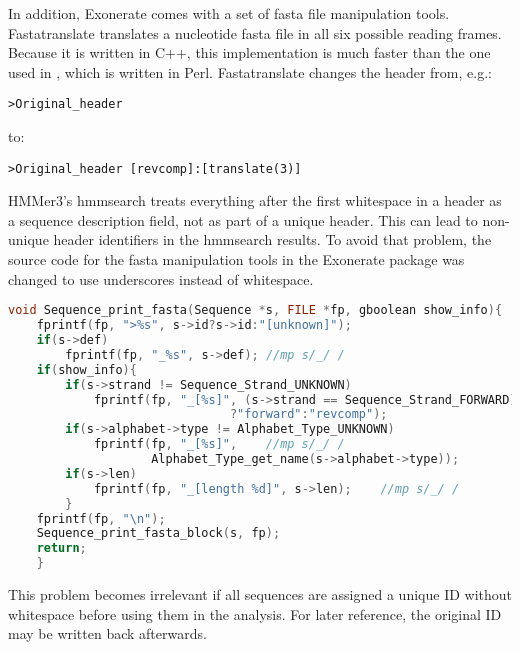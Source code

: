 In addition, Exonerate comes with a set of fasta file manipulation tools.
Fastatranslate translates a nucleotide fasta file in all six possible reading
frames. Because it is written in C++, this implementation is much faster than the
one used in \hamstr, which is written in Perl. Fastatranslate changes the
header from, e.g.:

\begin{verbatim}
>Original_header
\end{verbatim}

to:

\begin{verbatim}
>Original_header [revcomp]:[translate(3)]
\end{verbatim}

HMMer3's hmmsearch treats everything after the first whitespace in a header as a
sequence description field, not as part of a unique header. This can lead to
non-unique header identifiers in the hmmsearch results. To avoid that problem,
the source code for the fasta manipulation tools in the Exonerate package was
changed to use underscores instead of whitespace.

\begin{lstlisting}[language=c,caption=src/sequence/sequence.c]
void Sequence_print_fasta(Sequence *s, FILE *fp, gboolean show_info){
    fprintf(fp, ">%s", s->id?s->id:"[unknown]");
    if(s->def)
        fprintf(fp, "_%s", s->def);	//mp s/_/ /
    if(show_info){
        if(s->strand != Sequence_Strand_UNKNOWN)
            fprintf(fp, "_[%s]", (s->strand == Sequence_Strand_FORWARD)	//mp s/_/ /
                               ?"forward":"revcomp");
        if(s->alphabet->type != Alphabet_Type_UNKNOWN)
            fprintf(fp, "_[%s]",	//mp s/_/ /
                    Alphabet_Type_get_name(s->alphabet->type));
        if(s->len)
            fprintf(fp, "_[length %d]", s->len);	//mp s/_/ /
        }
    fprintf(fp, "\n");
    Sequence_print_fasta_block(s, fp);
    return;
    }
\end{lstlisting}

\label{uniq}
This problem becomes irrelevant if all sequences are assigned a unique ID
without whitespace before using them in the analysis. For later reference, the
original ID may be written back afterwards.
